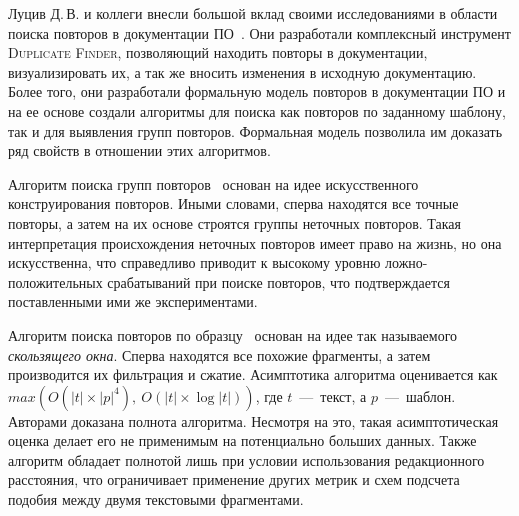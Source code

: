 

Луцив Д.\,В. и коллеги внесли большой вклад своими исследованиями в области поиска повторов в документации ПО~\cite{luciv2018detecting,luciv2018duplicate,luciv2019interactive,koznov2015clone,koznov2017duplicate,luciv2016fuzzy}. 
Они разработали комплексный инструмент \textsc{Duplicate Finder}, позволяющий находить повторы в документации, визуализировать их, а так же вносить изменения в исходную документацию.
Более того, они разработали формальную модель повторов в документации ПО и на ее основе создали алгоритмы для поиска как повторов по заданному шаблону, так и для выявления групп повторов.
Формальная модель позволила им доказать ряд свойств в отношении этих алгоритмов.

Алгоритм поиска групп повторов~\cite{luciv2016fuzzy} основан на идее искусственного конструирования повторов.
Иными словами, сперва находятся все точные повторы, а затем на их основе строятся группы неточных повторов.
Такая интерпретация происхождения неточных повторов имеет право на жизнь, но она искусственна, что справедливо приводит к высокому уровню ложно-положительных срабатываний при поиске повторов, что подтверждается поставленными ими же экспериментами.


Алгоритм поиска повторов по образцу~\cite{luciv2019interactive} основан на идее так называемого \emph{скользящего окна}.
Сперва находятся все похожие фрагменты, а затем производится их фильтрация и сжатие.
Асимптотика алгоритма оценивается как $max(O(|t|\times|p|^4),\ O(|t|\times \log |t|))$, где $t$~---~текст, а $p$~---~шаблон.
Авторами доказана полнота алгоритма.
Несмотря на это, такая асимптотическая оценка делает его не применимым на потенциально больших данных.
Также алгоритм обладает полнотой лишь при условии использования редакционного расстояния, что ограничивает применение других метрик и схем подсчета подобия между двумя текстовыми фрагментами.

